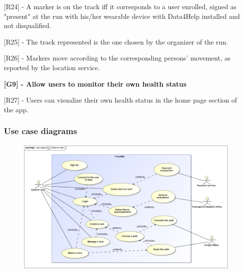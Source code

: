 [R24] - A marker is on the track iff it corresponds to a user enrolled, signed as "present" at the run with his/her wearable device with Data4Help installed and not disqualified. \newline

[R25] - The track represented is the one chosen by the organizer of the run. \newline

[R26] - Markers move according to the corresponding persons' movement, as reported by the location service. \newline

\hspace{-\parindent}\textbf{[G9] - Allow users to monitor their own health status} \newline

[R27] - Users can visualize their own health status in the home page section of the app. \newline
\newpage

\subsubsection{Use case diagrams}
\begin{figure}[h!]
\centering
\includegraphics[scale=0.43]{sections/diagrams/Generic_user.png} \newline
{}
\end{figure}

